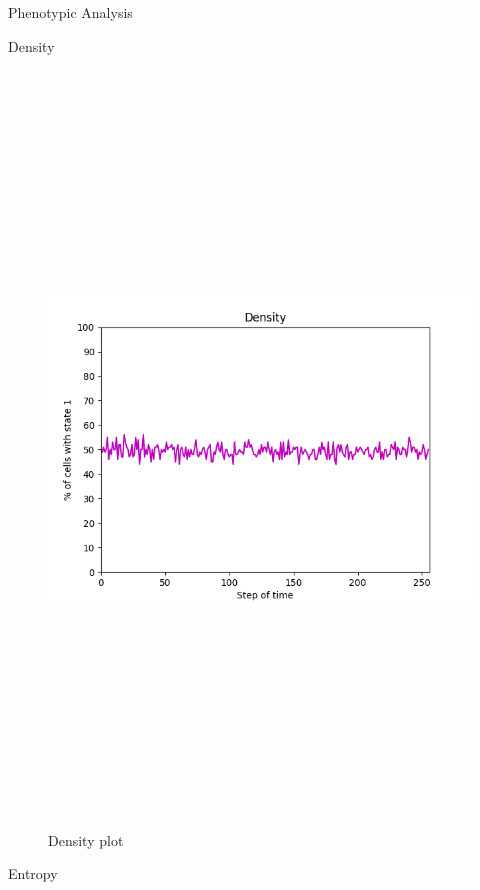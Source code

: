 \documentclass[12pt, letterpaper]{article}
\begin{document}
\begin{section}{Phenotypic Analysis} 
	\begin{subsection}{Density} 
		\begin{figure}[H] 
		\centering 
				\includegraphics[max width=200mm, max height=200mm, keepaspectratio]{SimDensity.png} 
			\caption{Density plot} 
		\end{figure} 
	\end{subsection} 
	\begin{subsection}{Entropy} 
		\begin{figure}[H] 
		\centering 

\end{figure}
\end{subsection}
\end{section}
\end{document}
